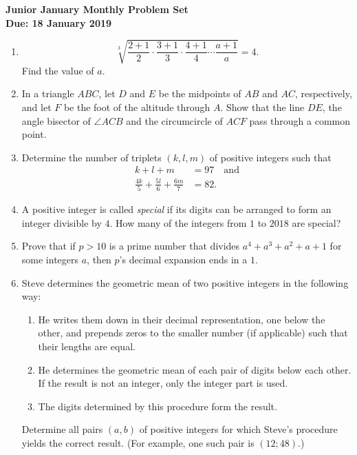 \documentclass{article}
\begin{document}
\begin{center}
\textbf{\Large Junior January Monthly Problem Set}
\\ \vspace{1em}
\textbf{\large Due: 18 January 2019}
\end{center}

\begin{enumerate}[1.]

\vspace{6pt}
\item %
\[ \sqrt[3]{\frac{2+1}{2}\cdot\frac{3+1}{3}\cdot\frac{4+1}{4}\dotsm\frac{a+1}{a}} = 4. \]
Find the value of $a$.


\vspace{6pt}
\item %
In a triangle $ABC$, let $D$ and $E$ be the midpoints of $AB$ and $AC$, respectively, and let $F$ be the foot of the altitude through $A$. Show that the line $DE$, the angle bisector of $\angle ACB$ and the circumcircle of $ACF$ pass through a common point.


\vspace{6pt}
\item %
Determine the number of triplets $(k,l,m)$ of positive integers such that
\begin{align*}
  k+l+m &= 97 \quad \mathrm{and} \\
  \frac{4k}{5} +\frac{5l}{6} +\frac{6m}{7} &= 82.
\end{align*}


\vspace{6pt}
\item %
A positive integer is called \emph{special} if its digits can be arranged to form an integer divisible by $4$. How many of the integers from $1$ to $2018$ are special?


\vspace{6pt}
\item %
Prove that if $p > 10$ is a prime number that divides $a^4+a^3+a^2+a+1$ for some integers $a$, then $p$'s decimal expansion ends in a $1$.


\vspace{6pt}
\item %
Steve determines the geometric mean of two positive integers in the following way:
\begin{enumerate}
	\item He writes them down in their decimal representation, one below the other, and prepends zeros to the smaller number (if applicable) such that their lengths are equal.
	\item He determines the geometric mean of each pair of digits below each other. If the result is not an integer, only the integer part is used.
	\item The digits determined by this procedure form the result.
\end{enumerate}
Determine all pairs $(a,b)$ of positive integers for which Steve's procedure yields the correct result. (For example, one such pair is $(12; 48)$.)



\end{enumerate}
\end{document}
